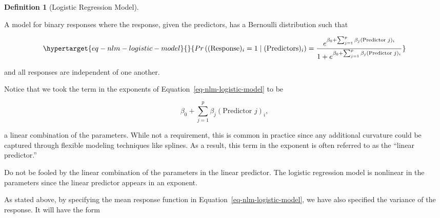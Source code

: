\documentclass[
  letterpaper,
  DIV=11,
  numbers=noendperiod]{scrreprt}
\theoremstyle{definition}
\newtheorem{definition}{Definition}[chapter]
\theoremstyle{definition}
\theoremstyle{remark}
\begin{document}
\begin{definition}[Logistic Regression
Model]\protect\hypertarget{def-logistic-regression}{}\label{def-logistic-regression}

A model for binary responses where the response, given the predictors,
has a Bernoulli distribution such that

\begin{equation}\protect\hypertarget{eq-nlm-logistic-model}{}{Pr\left((\text{Response})_i = 1 \mid (\text{Predictors})_i\right) = 
    \frac{e^{\beta_0 + \sum_{j=1}^{p} \beta_j (\text{Predictor } j)_i}}{1 + e^{\beta_0 + \sum_{j=1}^{p} \beta_j (\text{Predictor } j)_i}}}\label{eq-nlm-logistic-model}\end{equation}

and all responses are independent of one another.

\end{definition}

Notice that we took the term in the exponents of
Equation~\ref{eq-nlm-logistic-model} to be

\[\beta_0 + \sum_{j=1}^{p} \beta_j (\text{Predictor } j)_i,\]

a linear combination of the parameters. While not a requirement, this is
common in practice since any additional curvature could be captured
through flexible modeling techniques like splines. As a result, this
term in the exponent is often referred to as the ``linear predictor.''

\begin{tcolorbox}[enhanced jigsaw, left=2mm, toprule=.15mm, arc=.35mm, breakable, opacitybacktitle=0.6, opacityback=0, rightrule=.15mm, colbacktitle=quarto-callout-warning-color!10!white, coltitle=black, leftrule=.75mm, toptitle=1mm, colframe=quarto-callout-warning-color-frame, titlerule=0mm, title=\textcolor{quarto-callout-warning-color}{\faExclamationTriangle}\hspace{0.5em}{Warning}, bottomrule=.15mm, colback=white, bottomtitle=1mm]

Do not be fooled by the linear combination of the parameters in the
linear predictor. The logistic regression model is nonlinear in the
parameters since the linear predictor appears in an exponent.

\end{tcolorbox}

As stated above, by specifying the mean response function in
Equation~\ref{eq-nlm-logistic-model}, we have also specified the
variance of the response. It will have the form
\end{document}
